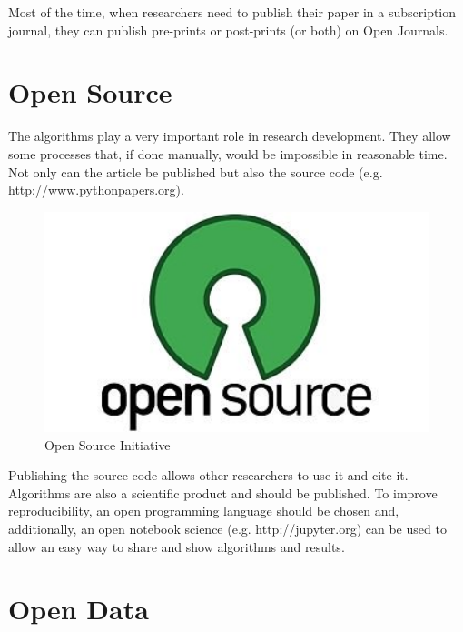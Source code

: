 \documentclass[a0,portrait]{a0poster}
\begin{document}
\begin{multicols}{2}
Most of the time, when researchers need to publish their paper in a subscription journal, they can publish pre-prints or post-prints (or both) on Open Journals.\\


\section*{Open Source}

The algorithms play a very important role in research development. They allow some processes that, if done manually, would be impossible in reasonable time. Not only can the article be published but also the source code (e.g. http://www.pythonpapers.org). \\

\begin{figure}
  \begin{center}
    \includegraphics[width=500px]{opensource.png}
  \end{center} 
  \caption{Open Source Initiative}
\end{figure}

Publishing the source code allows other researchers to use it and cite it. Algorithms are also a scientific product and should be published. To improve reproducibility, an open programming language should be chosen and, additionally, an open notebook science (e.g. http://jupyter.org) can be used to allow an easy way to share and show algorithms and results.\\

\section*{Open Data}


\end{multicols}
\end{document}
